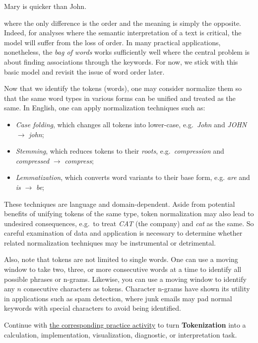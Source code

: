 \documentclass[
  letterpaper,
]{scrbook}
\newcounter{none} %
\begin{document}
Mary is quicker than John.

where the only difference is the order and the meaning is simply the
opposite. Indeed, for analyses where the semantic interpretation of a
text is critical, the model will suffer from the loss of order. In many
practical applications, nonetheless, the \emph{bag of words} works
sufficiently well where the central problem is about finding
associations through the keywords. For now, we stick with this basic
model and revisit the issue of word order later.

Now that we identify the tokens (words), one may consider normalize them
so that the same word types in various forms can be unified and treated
as the same. In English, one can apply normalization techniques such as:

\begin{itemize}
\item
  \emph{Case folding}, which changes all tokens into lower-case,
  e.g.~\emph{John} and \emph{JOHN} \(\to\) \emph{john};
\item
  \emph{Stemming}, which reduces tokens to their \emph{roots},
  e.g.~\emph{compression} and \emph{compressed} \(\to\) \emph{compress};
\item
  \emph{Lemmatization}, which converts word variants to their base form,
  e.g. \emph{are} and \emph{is} \(\to\) \emph{be};
\end{itemize}

These techniques are language and domain-dependent. Aside from potential
benefits of unifying tokens of the same type, token normalization may
also lead to undesired consequences, e.g.~to treat \emph{CAT} (the
company) and \emph{cat} as the same. So careful examination of data and
application is necessary to determine whether related normalization
techniques may be instrumental or detrimental.

Also, note that tokens are not limited to single words. One can use a
moving window to take two, three, or more consecutive words at a time to
identify all possible phrases or n-grams. Likewise, you can use a moving
window to identify any \(n\) consecutive characters as tokens. Character
n-grams have shown its utility in applications such as spam detection,
where junk emails may pad normal keywords with special characters to
avoid being identified.

\begin{tcolorbox}[enhanced jigsaw, arc=.35mm, bottomrule=.15mm, bottomtitle=1mm, breakable, colback=white, colbacktitle=quarto-callout-tip-color!10!white, colframe=quarto-callout-tip-color-frame, coltitle=black, left=2mm, leftrule=.75mm, opacityback=0, opacitybacktitle=0.6, rightrule=.15mm, title=\textcolor{quarto-callout-tip-color}{\faLightbulb}\hspace{0.5em}{Put it into practice}, titlerule=0mm, toprule=.15mm, toptitle=1mm]

Continue with \hyperref[sec-pr-11-tokenization]{the corresponding
practice activity} to turn \textbf{Tokenization} into a calculation,
implementation, visualization, diagnostic, or interpretation task.

\end{tcolorbox}
\end{document}
